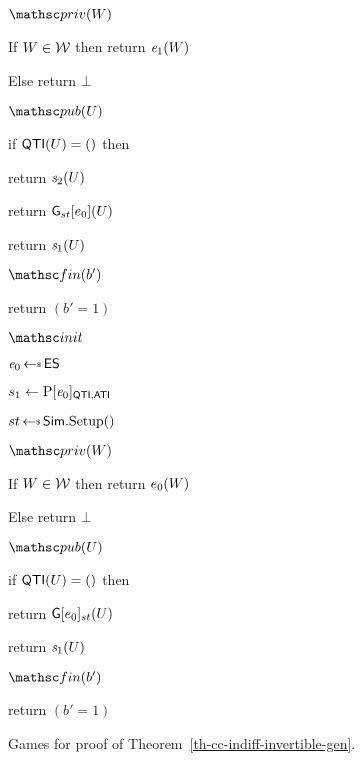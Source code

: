 \begin{figure}[t]
{		\ExptSepSpace
		
		
		\begin{oracle}{$\priv(W)$}
			\item If $W\in{\cal W}$ then return $\mathit{e}_1(W)$
			\item Else return $\bot$ 
		\end{oracle}
		\ExptSepSpace
		
		\begin{oracle}{$\pub(U)$}
			\item if $\mathsf{QTI}(U) = ()$ then
			\item \hindent return $\mathit{s}_2(U)$ 
			\item \hindent return $\mathsf{G}_{st}[e_0](U)$ 
			\item return $\mathit{s}_1(U)$
		\end{oracle}
		
		\ExptSepSpace
		
		\begin{oracle}{$\Finalize(b')$}
			\item return $(b' = 1)$
		\end{oracle}
	}
	{
		
		\begin{oracle}{$\Initialize$}
			\item $\aFunc{\functionOut}_0 \getsr \GenroSp{\functionOutSet}$ 
			\item  $s_1 \gets \mathrm{P}[\mathit{e}_0]_{\mathsf{QTI},\mathsf{ATI}}$
			\item $\commoncoins \getsr \SimgenCC()$
		\end{oracle}
		
		\ExptSepSpace
		
		\begin{oracle}{$\priv(W)$}
			\item If $W\in{\cal W}$ then return $e_0(W)$
			\item Else return $\bot$ 
		\end{oracle}
	}{
		
		\begin{oracle}{$\pub(U)$}
			\item if $\mathsf{QTI}(U) = ()$ then
			\item \hindent return $\mathsf{G}[e_0]_{st}(U)$
			\item return $\mathit{s}_1(U)$
		\end{oracle}
		
		\ExptSepSpace
		
		\begin{oracle}{$\Finalize(b')$}
			\item return $(b' = 1)$
		\end{oracle}
	}
	
	\caption{Games for proof of Theorem~\ref{th-cc-indiff-invertible-gen}.}
	\label{fig:th-cc-indiff-invertible-gen-games}
	\hrulefill
\end{figure}

